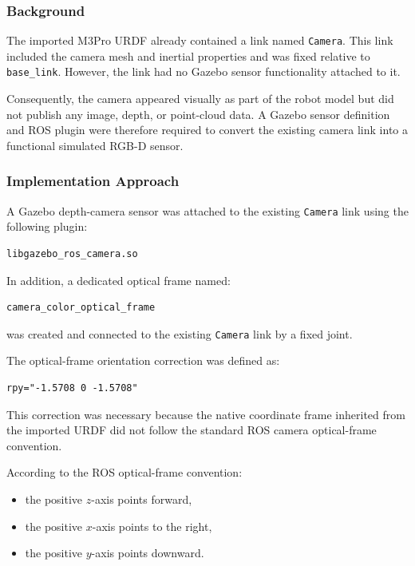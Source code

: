 \documentclass{article}
\begin{document}
\subsubsection{Background}

The imported M3Pro URDF already contained a link named \texttt{Camera}. This link included the camera mesh and inertial properties and was fixed relative to \texttt{base\_link}. However, the link had no Gazebo sensor functionality attached to it.

Consequently, the camera appeared visually as part of the robot model but did not publish any image, depth, or point-cloud data. A Gazebo sensor definition and ROS plugin were therefore required to convert the existing camera link into a functional simulated RGB-D sensor.

\subsubsection{Implementation Approach}

A Gazebo depth-camera sensor was attached to the existing \texttt{Camera} link using the following plugin:

\begin{verbatim}
libgazebo_ros_camera.so
\end{verbatim}

In addition, a dedicated optical frame named:

\begin{verbatim}
camera_color_optical_frame
\end{verbatim}

was created and connected to the existing \texttt{Camera} link by a fixed joint.

The optical-frame orientation correction was defined as:

\begin{verbatim}
rpy="-1.5708 0 -1.5708"
\end{verbatim}

This correction was necessary because the native coordinate frame inherited from the imported URDF did not follow the standard ROS camera optical-frame convention.

According to the ROS optical-frame convention:

\begin{itemize}
    \item the positive $z$-axis points forward,
    \item the positive $x$-axis points to the right,
    \item the positive $y$-axis points downward.
\end{itemize}
\end{document}

